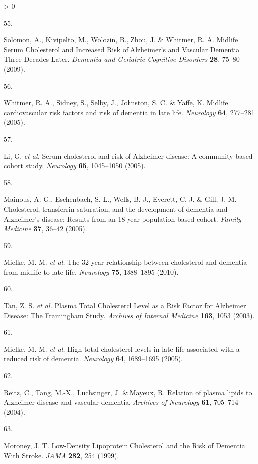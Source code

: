 \documentclass[a4paper, twoside]{templates/ociamthesis}
\newlength{\cslhangindent}
\newlength{\csllabelwidth}
\newenvironment{CSLReferences}[3] %
 {%
  \setlength{\parindent}{0pt}
  \ifodd #1 \everypar{\setlength{\hangindent}{\cslhangindent}}\ignorespaces\fi
  \ifnum #2 > 0
  \setlength{\parskip}{#2\baselineskip}
  \fi
 }%
 {}
\newcommand{\CSLLeftMargin}[1]{\parbox[t]{\maxof{\widthof{#1}}{\csllabelwidth}}{#1}}
\newcommand{\CSLRightInline}[1]{\parbox[t]{\linewidth - \csllabelwidth}{#1}}
\begin{document}
\begin{CSLReferences}{0}{0}
\leavevmode\hypertarget{ref-solomon2009}{}%
\CSLLeftMargin{55. }
\CSLRightInline{Solomon, A., Kivipelto, M., Wolozin, B., Zhou, J. \& Whitmer, R. A. Midlife {Serum Cholesterol} and {Increased Risk} of {Alzheimer}'s and {Vascular Dementia Three Decades Later}. \emph{Dementia and Geriatric Cognitive Disorders} \textbf{28}, 75--80 (2009).}

\leavevmode\hypertarget{ref-whitmer2005}{}%
\CSLLeftMargin{56. }
\CSLRightInline{Whitmer, R. A., Sidney, S., Selby, J., Johnston, S. C. \& Yaffe, K. Midlife cardiovascular risk factors and risk of dementia in late life. \emph{Neurology} \textbf{64}, 277--281 (2005).}

\leavevmode\hypertarget{ref-li2005}{}%
\CSLLeftMargin{57. }
\CSLRightInline{Li, G. \emph{et al.} Serum cholesterol and risk of {Alzheimer} disease: A community-based cohort study. \emph{Neurology} \textbf{65}, 1045--1050 (2005).}

\leavevmode\hypertarget{ref-mainous2005}{}%
\CSLLeftMargin{58. }
\CSLRightInline{Mainous, A. G., Eschenbach, S. L., Wells, B. J., Everett, C. J. \& Gill, J. M. Cholesterol, transferrin saturation, and the development of dementia and {Alzheimer}'s disease: Results from an 18-year population-based cohort. \emph{Family Medicine} \textbf{37}, 36--42 (2005).}

\leavevmode\hypertarget{ref-mielke2010}{}%
\CSLLeftMargin{59. }
\CSLRightInline{Mielke, M. M. \emph{et al.} The 32-year relationship between cholesterol and dementia from midlife to late life. \emph{Neurology} \textbf{75}, 1888--1895 (2010).}

\leavevmode\hypertarget{ref-tan2003}{}%
\CSLLeftMargin{60. }
\CSLRightInline{Tan, Z. S. \emph{et al.} Plasma {Total Cholesterol Level} as a {Risk Factor} for {Alzheimer Disease}: The {Framingham Study}. \emph{Archives of Internal Medicine} \textbf{163}, 1053 (2003).}

\leavevmode\hypertarget{ref-mielke2005}{}%
\CSLLeftMargin{61. }
\CSLRightInline{Mielke, M. M. \emph{et al.} High total cholesterol levels in late life associated with a reduced risk of dementia. \emph{Neurology} \textbf{64}, 1689--1695 (2005).}

\leavevmode\hypertarget{ref-reitz2004}{}%
\CSLLeftMargin{62. }
\CSLRightInline{Reitz, C., Tang, M.-X., Luchsinger, J. \& Mayeux, R. Relation of plasma lipids to {Alzheimer} disease and vascular dementia. \emph{Archives of Neurology} \textbf{61}, 705--714 (2004).}

\leavevmode\hypertarget{ref-moroney1999}{}%
\CSLLeftMargin{63. }
\CSLRightInline{Moroney, J. T. Low-{Density Lipoprotein Cholesterol} and the {Risk} of {Dementia With Stroke}. \emph{JAMA} \textbf{282}, 254 (1999).}


\end{CSLReferences}
\end{document}
